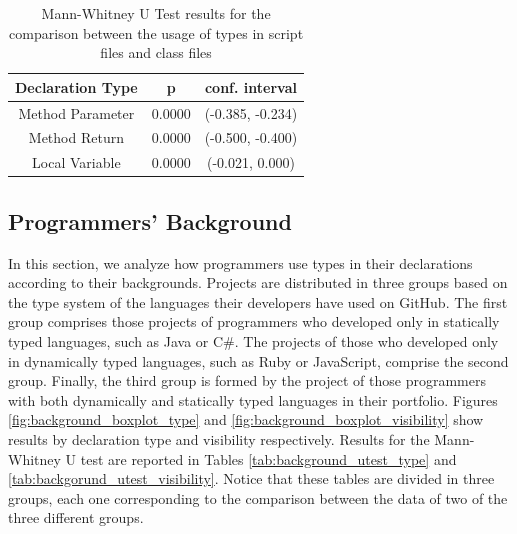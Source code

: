 \documentclass[preprint]{sigplanconf}
\begin{document}
\begin{table}[ht]
\centering{}%
\begin{tabular}{|c|c|c|}
\hline 
Declaration Type & p & conf. interval \\
\hline 
\hline 
Method Parameter              & 0.0000	& (-0.385, -0.234) \\ \hline
Method Return                 & 0.0000	& (-0.500, -0.400) \\ \hline
Local Variable                & 0.0000	& (-0.021, 0.000)  \\ \hline
\end{tabular}
\label{tab:script_utest_all}
\caption{Mann-Whitney U Test results for the comparison between the usage of types in script files and class files}
\end{table}



\subsection{Programmers' Background\label{res-background}}
In this section, we analyze how programmers use types in their declarations according to their backgrounds.
Projects are distributed in three groups based on the type system of the languages their developers have used on GitHub.
The first group comprises those projects of programmers who developed only in statically typed languages, such as Java or C\#.
The projects of those who developed only in dynamically typed languages, such as Ruby or JavaScript, comprise the second group.
Finally, the third group is formed by the project of those programmers with both dynamically and statically typed languages in their portfolio.
Figures \ref{fig:background_boxplot_type} and \ref{fig:background_boxplot_visibility}  show results by declaration type and visibility respectively.
Results for the Mann-Whitney U test are reported in Tables \ref{tab:background_utest_type} and \ref{tab:backgorund_utest_visibility}.
Notice that these tables are divided in three groups, each one corresponding to the comparison between the data of two of the three different groups.
\end{document}
